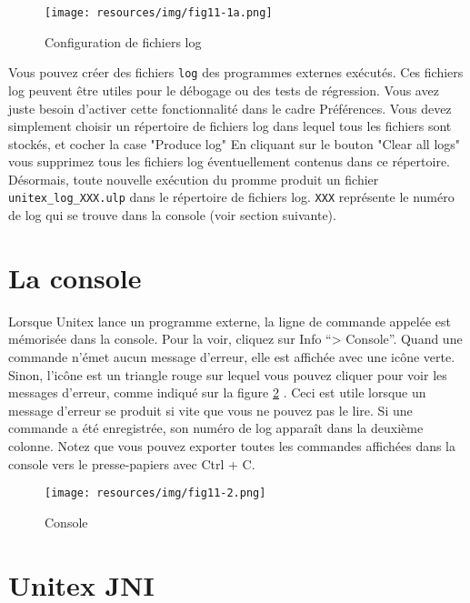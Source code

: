 \bigskip
\begin{figure}[!ht]
\begin{center}
\texttt{[image: resources/img/fig11-1a.png]}
\caption{Configuration de fichiers log\label{fig-logging-config}}
\end{center}
\end{figure}

Vous pouvez créer des fichiers \verb+log+ des programmes externes exécutés.
Ces fichiers log peuvent être utiles pour le débogage ou des tests de régression. Vous avez juste
besoin d'activer cette fonctionnalité dans le cadre Préférences. Vous devez simplement choisir un
répertoire de fichiers log dans lequel tous les fichiers sont stockés, et cocher la case "Produce
log"
En cliquant sur le bouton "Clear all logs" vous supprimez tous les fichiers log éventuellement
contenus dans ce répertoire. Désormais, toute nouvelle exécution du promme produit un fichier
\verb+unitex_log_XXX.ulp+ dans le répertoire de fichiers log. \verb+XXX+ représente le numéro de
log qui se trouve dans la console (voir section suivante).



\section{La console}
\label{section-console}
Lorsque Unitex lance un programme externe, la ligne de commande appelée est mémorisée dans la
console. Pour la voir, cliquez sur Info ``> Console''. Quand une commande n'émet aucun message
d'erreur, elle est affichée avec une icône verte. Sinon, l'icône est un triangle rouge sur lequel
vous pouvez cliquer pour voir les messages d'erreur, comme indiqué sur la figure \ref{fig-console}
. Ceci est utile lorsque un message d'erreur se produit si vite que vous ne pouvez pas le lire. Si
une commande a été enregistrée, son numéro de log apparaît dans la deuxième colonne. Notez que vous
pouvez exporter toutes les commandes affichées dans la console vers le presse-papiers avec Ctrl + C.

\bigskip
\begin{figure}[!ht]
\begin{center}
\texttt{[image: resources/img/fig11-2.png]}
\caption{Console\label{fig-console}}
\end{center}
\end{figure}

\section{Unitex JNI}
\label{section-unitex-JNI}


